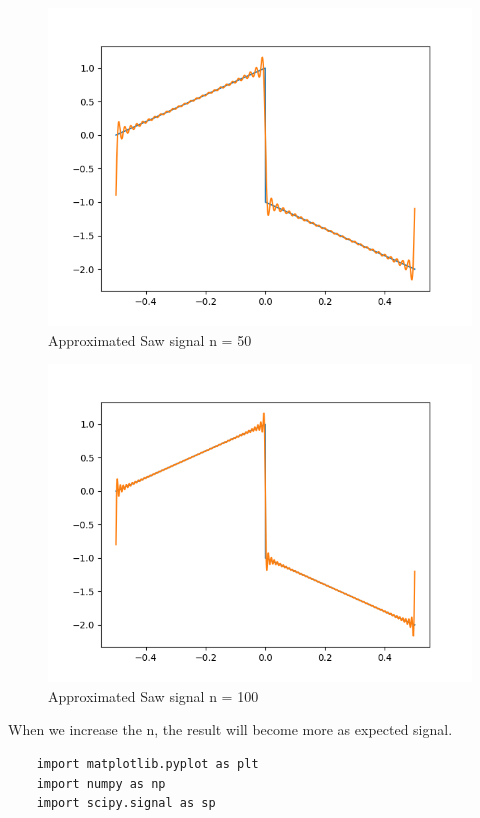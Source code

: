 \documentclass[10pt,a4paper, margin=1in]{article}
\begin{document}
\begin{enumerate}
\begin{enumerate}
\begin{figure}[H]
            \includegraphics[scale=0.75]{approximatedSaw_n=50.png}
            \caption{Approximated Saw signal n = 50}
        \end{figure}
        \begin{figure}[H]
            \includegraphics[scale=0.75]{approximatedSaw_n=100.png}
            \caption{Approximated Saw signal n = 100}
        \end{figure}
        When we increase the n, the result will become more as expected signal.
    \end{enumerate}

    \lstset{language=Python}
    \lstset{frame=single}
    \lstset{basicstyle=\footnotesize}
    \begin{lstlisting}
    import matplotlib.pyplot as plt
    import numpy as np
    import scipy.signal as sp


\end{lstlisting}
\end{enumerate}
\end{document}
